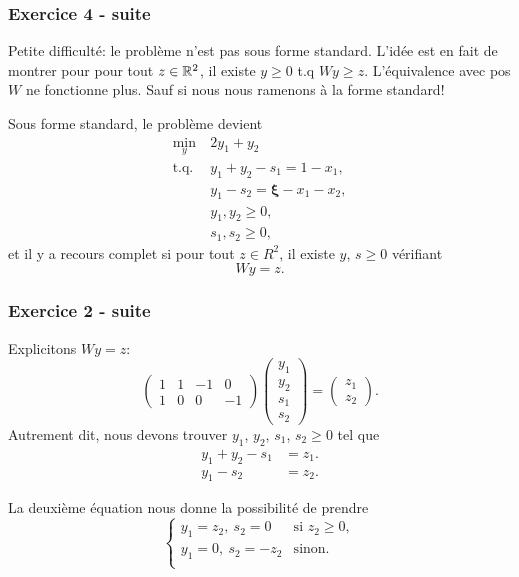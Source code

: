 \documentclass{beamer}
\def\bxi{\boldsymbol\xi}
\begin{document}
\begin{frame}
\frametitle{Exercice 4 - suite}

Petite difficulté: le problème n'est pas sous forme standard.
L'idée est en fait de montrer pour pour tout $z \in \mathbb{R}^2$, il existe
$y \geq 0$ t.q $Wy \geq z$. L'équivalence avec pos$W$ ne fonctionne
plus. Sauf si nous nous ramenons à la forme standard!

\mbox{}

Sous forme standard, le problème devient
\begin{align*}
\min_y\ & 2y_1+y_2\\
\mbox{t.q. } & y_1 + y_2 - s_1 = 1-x_1,\\
& y_1 - s_2 = \bxi - x_1-x_2,\\
& y_1, y_2 \geq 0,\\
& s_1, s_2 \geq 0,
\end{align*}
et il y a recours complet si pour tout $z \in R^2$, il existe $y$, $s
\geq 0$ vérifiant
\[
Wy = z.
\]

\end{frame}

\begin{frame}
\frametitle{Exercice 2 - suite}

Explicitons $Wy = z$:
\[
\begin{pmatrix}
1 & 1 & -1 & 0 \\
1 & 0 & 0  & -1
\end{pmatrix}
\begin{pmatrix} y_1 \\ y_2 \\ s_1 \\ s_2 \end{pmatrix} =
\begin{pmatrix} z_1 \\ z_2 \end{pmatrix}.
\]
Autrement dit, nous devons trouver $y_1$, $y_2$, $s_1$, $s_2 \geq 0$
tel que
\begin{align*}
y_1 + y_2 - s_1 &= z_1. \\
y_1 - s_2 &= z_2.
\end{align*}

La deuxième équation nous donne la possibilité de prendre
\[
\begin{cases}
y_1 = z_2,\ s_2 = 0 & \mbox{si } z_2 \geq 0,\\
y_1 = 0,\ s_2 = -z_2 & \mbox{sinon}.\\
\end{cases}
\]

\end{frame}
\end{document}
